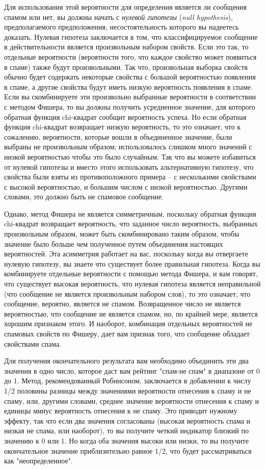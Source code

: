 Для использования этой вероятности для определения является ли сообщения спамом или нет,
вы должны начать с \textit{нулевой гипотезы} (\textit{null hypothesis}), предполагаемого
предположения, несостоятельность которого вы надеетесь доказать. Нулевая гипотеза
заключается в том, что классифицируемое сообщение в действительности является произвольным
набором свойств.  Если это так, то отдельные вероятности (вероятности того, что каждое
свойство может появиться в спаме) также будут произвольными.  Так что, произвольная
выборка свойств обычно будет содержать некоторые свойства с большой вероятностью появления
в спаме, а другие свойства будут иметь низкую вероятность появления в спаме.  Если вы
скомбинируете эти произвольно выбранные вероятности в соответствии с методом Фишера, то вы
должны получить усредненное значение, для которого обратная функция chi-квадрат сообщит
вероятность успеха.  Но если обратная функция chi-квадрат возвращает низкую вероятность,
то это означает, что к сожалению, вероятности, которые вошли в объединенное значение, были
выбраны не произвольным образом; использовалось слишком много значений с низкой
вероятностью чтобы это было случайным. Так что вы можете избавиться от нулевой гипотезы и
вместо этого использовать альтернативную гипотезу, что свойства были взяты из
противоположного примера -- с несколькими свойствами с высокой вероятностью, и большим
числом с низкой вероятностью.  Другими словами, это должно быть не спамовое сообщение.

Однако, метод Фишера не является симметричным, поскольку обратная функция chi-квадрат
возвращает вероятность, что заданное число вероятность, выбранных произвольным образом,
может быть скомбинировано таким образом, чтобы значение было больше чем полученное путем
объединения настоящих вероятностей.  Эта асимметрия работает на вас, поскольку когда вы
отвергаете нулевую гипотезу, вы знаете что существует более правильная гипотеза.  Когда вы
комбинируете отдельные вероятности с помощью метода Фишера, и вам говорят, что существует
высокая вероятность, что нулевая гипотеза является неправильной (что сообщение не является
произвольным набором слов), то это означает, что сообщение, вероятно, является не спамом.
Возвращенное число не является вероятностью, что сообщение не является спамом, но, по
крайней мере, является хорошим признаком этого.  И наоборот, комбинация отдельных
вероятностей не спамовых свойств по Фишеру, дает вам признак того, что сообщение обладает
свойствами спама.

Для получения окончательного результата вам необходимо объединить эти два значения в одно
число, которое даст вам рейтинг "спам-не спам" в диапазоне от 0 до 1.  Метод,
рекомендованный Робинсоном, заключается в добавлении к числу 1/2 половины разницы между
значениями вероятности отнесения к спаму и не спаму, или, другими словами, среднее
значение вероятности отнесения к спаму и единицы минус вероятность отнесения к не спаму.
Это приводит нужному эффекту, так что если два значения согласованы (высокая вероятность
спама и низкая не спама, или наоборот), то вы получите четкий индикатор близкий по
значению к 0 или 1.  Но когда оба значения высоки или низки, то вы получите окончательное
значение приблизительно равное 1/2, что будет рассматриваться как "неопределенное".

